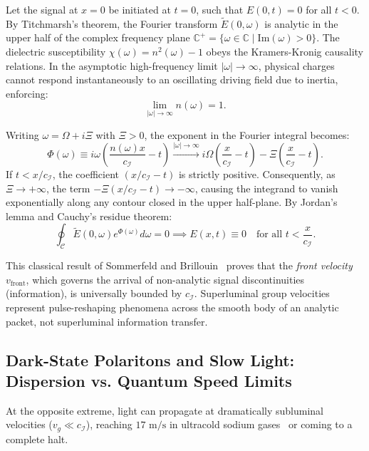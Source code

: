 \documentclass[11pt,a4paper]{article}
\begin{document}
Let the signal at $x = 0$ be initiated at $t = 0$, such that $E(0, t) = 0$ for all $t < 0$. By Titchmarsh's theorem, the Fourier transform $\tilde{E}(0, \omega)$ is analytic in the upper half of the complex frequency plane $\mathbb{C}^+ = \{\omega \in \mathbb{C} \mid \text{Im}(\omega) > 0\}$. The dielectric susceptibility $\chi(\omega) = n^2(\omega) - 1$ obeys the Kramers-Kronig causality relations. In the asymptotic high-frequency limit $|\omega| \to \infty$, physical charges cannot respond instantaneously to an oscillating driving field due to inertia, enforcing:
\begin{equation}
\lim_{|\omega| \to \infty} n(\omega) = 1.
\end{equation}

Writing $\omega = \Omega + i\Xi$ with $\Xi > 0$, the exponent in the Fourier integral becomes:
\begin{equation}
\Phi(\omega) \equiv i\omega \left( \frac{n(\omega) x}{c_{\mathcal{I}}} - t \right) \xrightarrow{|\omega| \to \infty} i\Omega \left( \frac{x}{c_{\mathcal{I}}} - t \right) - \Xi \left( \frac{x}{c_{\mathcal{I}}} - t \right).
\end{equation}
If $t < x / c_{\mathcal{I}}$, the coefficient $(x / c_{\mathcal{I}} - t)$ is strictly positive. Consequently, as $\Xi \to +\infty$, the term $-\Xi(x/c_{\mathcal{I}} - t) \to -\infty$, causing the integrand to vanish exponentially along any contour closed in the upper half-plane. By Jordan's lemma and Cauchy's residue theorem:
\begin{equation}
\oint_{\mathcal{C}} \tilde{E}(0, \omega) e^{\Phi(\omega)} d\omega = 0 \implies \boxed{E(x, t) \equiv 0 \quad \text{for all } t < \frac{x}{c_{\mathcal{I}}}.}
\end{equation}

This classical result of Sommerfeld and Brillouin~\cite{sommerfeld1914,brillouin1914} proves that the \emph{front velocity} $v_{\text{front}}$, which governs the arrival of non-analytic signal discontinuities (information), is universally bounded by $c_{\mathcal{I}}$. Superluminal group velocities represent pulse-reshaping phenomena across the smooth body of an analytic packet, not superluminal information transfer.

\subsection{Dark-State Polaritons and Slow Light: Dispersion vs. Quantum Speed Limits}

At the opposite extreme, light can propagate at dramatically subluminal velocities ($v_g \ll c_{\mathcal{I}}$), reaching $17\text{ m/s}$ in ultracold sodium gases~\cite{hau1999} or coming to a complete halt. 
\end{document}
